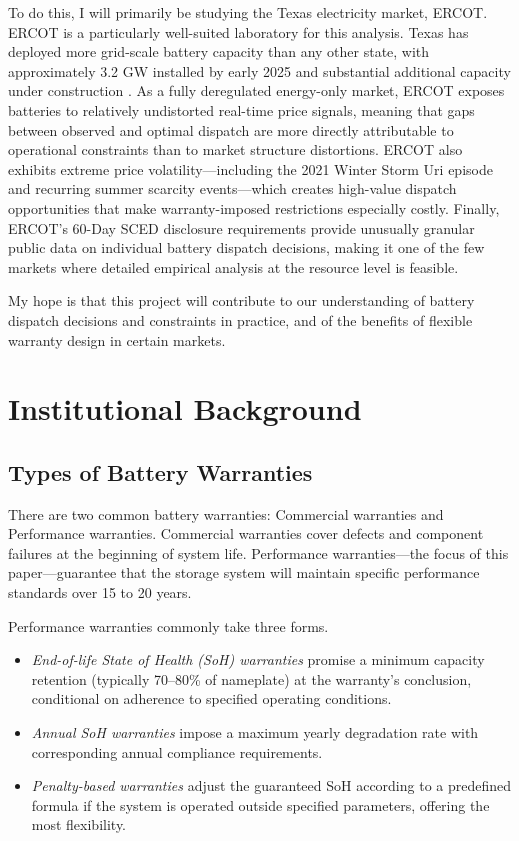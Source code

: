 \documentclass[12pt]{article}
\begin{document}
To do this, I will primarily be studying the Texas electricity market, ERCOT. ERCOT is a particularly well-suited laboratory for this analysis. Texas has deployed more grid-scale battery capacity than any other state, with approximately 3.2 GW installed by early 2025 and substantial additional capacity under construction \citep{reynolds2025}. As a fully deregulated energy-only market, ERCOT exposes batteries to relatively undistorted real-time price signals, meaning that gaps between observed and optimal dispatch are more directly attributable to operational constraints than to market structure distortions. ERCOT also exhibits extreme price volatility---including the 2021 Winter Storm Uri episode and recurring summer scarcity events---which creates high-value dispatch opportunities that make warranty-imposed restrictions especially costly. Finally, ERCOT's 60-Day SCED disclosure requirements provide unusually granular public data on individual battery dispatch decisions, making it one of the few markets where detailed empirical analysis at the resource level is feasible.


My hope is that this project will contribute to our understanding of battery dispatch decisions and constraints in practice, and of the benefits of flexible warranty design in certain markets.


\section{Institutional Background}

\subsection{Types of Battery Warranties}

There are two common battery warranties: Commercial warranties and Performance warranties. Commercial warranties cover defects and component failures at the beginning of system life. Performance warranties---the focus of this paper---guarantee that the storage system will maintain specific performance standards over 15 to 20 years. 

Performance warranties commonly take three forms. 
\begin{itemize}
    \item \textit{End-of-life State of Health (SoH) warranties} promise a minimum capacity retention (typically 70--80\% of nameplate) at the warranty's conclusion, conditional on adherence to specified operating conditions.
    \item  \textit{Annual SoH warranties} impose a maximum yearly degradation rate with corresponding annual compliance requirements.
    \item \textit{Penalty-based warranties} adjust the guaranteed SoH according to a predefined formula if the system is operated outside specified parameters, offering the most flexibility. 
\end{itemize}
\end{document}
